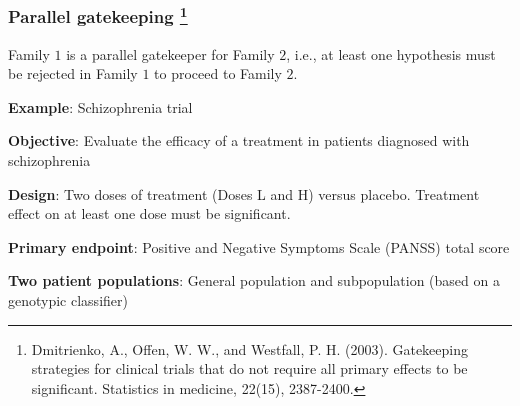 \documentclass[xcolor={dvipsnames}]{beamer}
\newcommand{\rbf}[1]{\textcolor{redUnipd}{ #1}}
\begin{document}
\begin{frame}

\end{frame}

\begin{frame}
\frametitle{Parallel gatekeeping \footnote{Dmitrienko, A., Offen, W. W., and Westfall, P. H. (2003). Gatekeeping strategies for clinical trials that do not require all primary effects to be significant. Statistics in medicine, 22(15), 2387-2400.}}

Family $1$ is a \rbf{parallel gatekeeper} for Family $2$, i.e., at least one hypothesis must be rejected in Family $1$ to proceed to Family $2$.

\bigskip

\rbf{\textbf{Example}}: Schizophrenia trial

\textbf{Objective}: Evaluate the efficacy of a treatment in patients diagnosed with schizophrenia

\textbf{Design}: Two doses of treatment (Doses L and H) versus placebo. Treatment effect on at least one dose must be
significant.

\textbf{Primary endpoint}: Positive and Negative Symptoms Scale (PANSS) total score

\textbf{Two patient populations}: General population and subpopulation (based on a genotypic classifier)
\end{frame}
\end{document}
